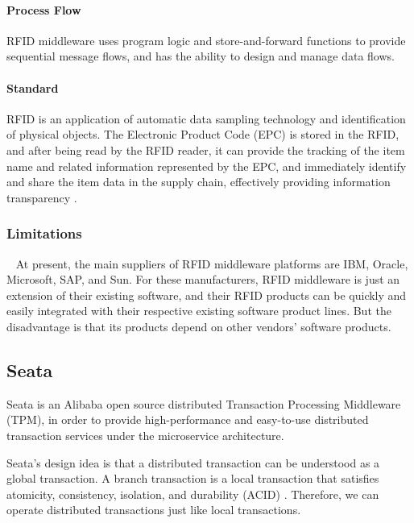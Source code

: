 \documentclass[conference]{IEEEtran}
\begin{document}
\paragraph{Process Flow}
RFID middleware uses program logic and store-and-forward functions to provide sequential message flows, and has the ability to design and manage data flows.

\paragraph{Standard}
RFID is an application of automatic data sampling technology and identification of physical objects. The Electronic Product Code (EPC) is stored in the RFID, and after being read by the RFID reader, it can provide the tracking of the item name and related information represented by the EPC, and immediately identify and share the item data in the supply chain, effectively providing information transparency .

\subsubsection{Limitations}
\
\newline
\indent
 At present, the main suppliers of RFID middleware platforms are IBM, Oracle, Microsoft, SAP, and Sun. For these manufacturers, RFID middleware is just an extension of their existing software, and their RFID products can be quickly and easily integrated with their respective existing software product lines. But the disadvantage is that its products depend on other vendors' software products.
 
 
 \subsection{Seata}

Seata is an Alibaba open source distributed Transaction Processing Middleware (TPM), in order to provide high-performance and easy-to-use distributed transaction services under the microservice architecture.

Seata's design idea is that a distributed transaction can be understood as a global transaction. A branch transaction is a local transaction that satisfies atomicity, consistency, isolation, and durability (ACID) \cite{b11}. Therefore, we can operate distributed transactions just like local transactions.
\end{document}
